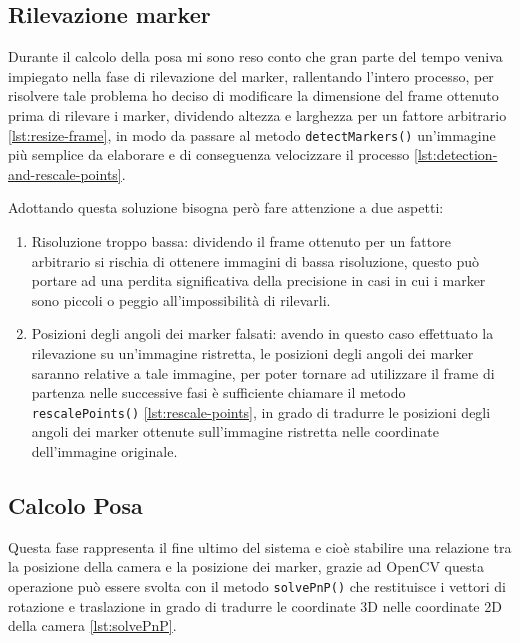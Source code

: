 \documentclass[12pt,a4paper,openright,twoside]{book}
\begin{document}
\subsection{Rilevazione marker} \label{subsec:rilevazione_marker}
Durante il calcolo della posa mi sono reso conto che gran parte del tempo veniva impiegato nella fase di rilevazione del marker, rallentando l'intero processo, per risolvere tale problema ho deciso di modificare la dimensione del frame ottenuto prima di rilevare i marker, dividendo altezza e larghezza per un fattore arbitrario \cref{lst:resize-frame}, in modo da passare al metodo \texttt{detectMarkers()} un'immagine più semplice da elaborare e di conseguenza velocizzare il processo \cref{lst:detection-and-rescale-points}.



Adottando questa soluzione bisogna però fare attenzione a due aspetti:
\begin{enumerate}
	\item Risoluzione troppo bassa: dividendo il frame ottenuto per un fattore arbitrario si rischia di ottenere immagini di bassa risoluzione, questo può portare ad una perdita significativa della precisione in casi in cui i marker sono piccoli o peggio all'impossibilità di rilevarli.
	\item Posizioni degli angoli dei marker falsati: avendo in questo caso effettuato la rilevazione su un'immagine ristretta, le posizioni degli angoli dei marker saranno relative a tale immagine, per poter tornare ad utilizzare il frame di partenza nelle successive fasi è sufficiente chiamare il metodo \texttt{rescalePoints()} \cref{lst:rescale-points}, in grado di tradurre le posizioni degli angoli dei marker ottenute sull'immagine ristretta nelle coordinate dell'immagine originale.
	
\end{enumerate}
\subsection{Calcolo Posa} \label{subsec:calcolo_posa}
Questa fase rappresenta il fine ultimo del sistema e cioè stabilire una relazione tra la posizione della camera e la posizione dei marker, grazie ad OpenCV questa operazione può essere svolta con il metodo \texttt{solvePnP()}
che restituisce i vettori di rotazione e traslazione in grado di tradurre le coordinate 3D nelle coordinate 2D della camera \cref{lst:solvePnP}.
\end{document}

